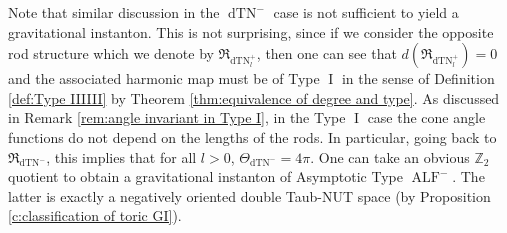 \documentclass[a4paper,11pt]{amsart}
\theoremstyle{definition}
\numberwithin{equation}{section}
\newcommand{\dZ}{\mathbb{Z}}
\newcommand{\mR} {\mathfrak R}
\DeclareMathOperator{\I}{I}
\DeclareMathOperator{\ALF}{ALF}
\DeclareMathOperator{\dTN}{dTN}
\begin{document}
Note that similar discussion in the $\dTN^-$ case is not sufficient to yield a gravitational instanton. This is not surprising, since if we consider the opposite rod structure which we denote by $\mR_{\dTN^+_l}$, then one can see that $d(\mR_{\dTN^+_l})=0$ and the associated harmonic map must be of Type $\I$ in the sense of Definition \ref{def:Type IIIIII} by Theorem \ref{thm:equivalence of degree and type}. 
As discussed in Remark \ref{rem:angle invariant in Type I}, in the Type $\I$ case the cone angle functions do not depend on the lengths of the rods. In particular, going back to $\mR_{\dTN^-}$, this implies that for all $l>0$, $\Theta_{\dTN^{-}}=4\pi$. One can take an obvious $\dZ_2$ quotient to obtain a gravitational instanton of Asymptotic Type $\ALF^-$. The latter is exactly a negatively oriented double Taub-NUT space (by Proposition  \ref{c:classification of toric GI}).


 
\end{document}

